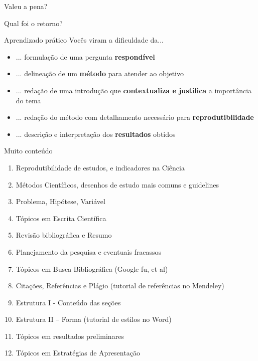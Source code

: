 \documentclass{beamer}
\begin{document}
\begin{frame}
  \begin{center}
    Valeu a pena?

    \vfill
  \end{center}
\end{frame}

\begin{frame}{\scriptsize Qual foi o retorno?}
  \begin{block}{Aprendizado prático}
    {\tiny \centering Vocês viram a dificuldade da...}
    \bigskip
    \begin{itemize}
      \scriptsize
    \item<1,6> ... formulação de uma pergunta {\bf respondível}
      \bigskip
    \item<2,6> ... delineação de um {\bf método} para atender ao objetivo
      \bigskip
    \item<3,6> {... redação de uma introdução que {\bf contextualiza e justifica} a importância do tema}
      \bigskip
    \item<4,6> ... redação do método com detalhamento necessário para {\bf reprodutibilidade} 
      \bigskip
    \item<5,6> ... descrição e interpretação dos {\bf resultados} obtidos
    \end{itemize}
  \end{block}
    \vfill
\end{frame}

\begin{frame}{Muito conteúdo}
  \begin{enumerate}
    \scriptsize
  \item Reprodutibilidade de estudos, e indicadores na Ciência
  \item Métodos Científicos, desenhos de estudo mais comuns e guidelines
  \item Problema, Hipótese, Variável
  \item Tópicos em Escrita Científica
  \item Revisão bibliográfica e Resumo
  \item Planejamento da pesquisa e eventuais fracassos
  \item Tópicos em Busca Bibliográfica (Google-fu, et al)
  \item Citações, Referências e Plágio (tutorial de referências no Mendeley)
  \item Estrutura I - Conteúdo das seções
  \item Estrutura II – Forma (tutorial de estilos no Word)
  \item Tópicos em resultados preliminares
  \item Tópicos em Estratégias de Apresentação
  \end{enumerate}
\end{frame}
\end{document}
